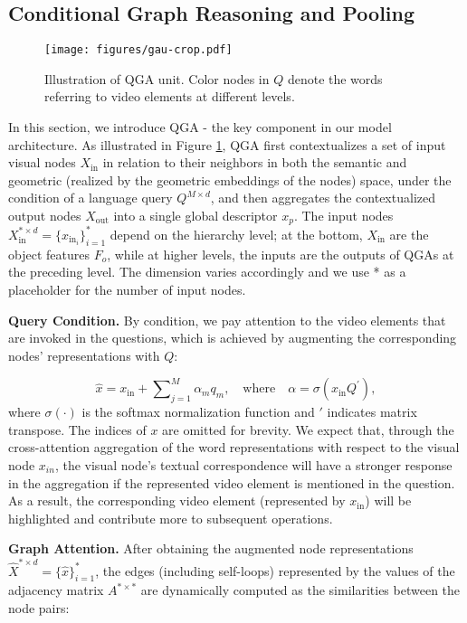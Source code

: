 \documentclass[letterpaper]{article} \usepackage{aaai21}  \usepackage{times}  \usepackage{helvet} \usepackage{courier}  \usepackage[hyphens]{url}  \usepackage{graphicx} \urlstyle{rm} \def\UrlFont{\rm}  \usepackage{natbib}  \usepackage{caption} \usepackage{color, colortbl}
\begin{document}
\subsection{Conditional Graph Reasoning and Pooling}
\begin{figure}[t]
\centering
\texttt{[image: figures/gau-crop.pdf]}
\caption{Illustration of QGA unit. Color nodes in $Q$ denote the words referring to video elements at different levels.}
\label{fig:qga}
\vspace{-1.0em}
\end{figure}
In this section, we introduce QGA - the key component in our model architecture. As illustrated in Figure \ref{fig:qga}, QGA first contextualizes a set of input visual nodes $X_{\text{in}}$ in relation to their neighbors in both the semantic and geometric (realized by the geometric embeddings of the nodes) space, under the condition of a language query $Q^{M \times d}$, and then aggregates the contextualized output nodes $X_{\text{out}}$ into a single global descriptor $x_p$. The input nodes $X_{\text{in}}^{* \times d}=\{x_{\text{in}_{i}}\}_{i=1}^*$ depend on the hierarchy level; at the bottom, $X_{\text{in}}$ are the object features $F_o$, while at higher levels, the inputs are the outputs of QGAs at the preceding level. The dimension varies accordingly and we use * as a placeholder for the number of input nodes.

\textbf{Query Condition.} By condition, we pay attention to the video elements that are invoked in the questions, which is achieved by augmenting the corresponding nodes' representations with $Q$:

\begin{equation}
\hat{x} = x_{\text{in}} + \sum\nolimits_{j=1}^M \alpha_m q_m, \quad \text{where} \quad \alpha = \sigma(x_{\text{in}}Q^\mathrm{'}), 
\end{equation}
where $\sigma(\cdot)$ is the softmax normalization function and $\mathrm{'}$ indicates matrix transpose. The indices of $x$ are omitted for brevity. We expect that, through the cross-attention aggregation of the word representations with respect to the visual node $x_{in}$, the visual node's textual correspondence will have a stronger response in the aggregation if the represented video element is mentioned in the question. As a result, the corresponding video element (represented by $x_{\text{in}}$) will be highlighted and contribute more to subsequent operations.

\textbf{Graph Attention.}
After obtaining the augmented node representations $\hat{X}^{*\times d}=\{\hat{x}\}_{i=1}^*$, the edges (including self-loops) represented by the values of the adjacency matrix $A^{*\times *}$ are dynamically computed as the similarities between the node pairs:
\end{document}
